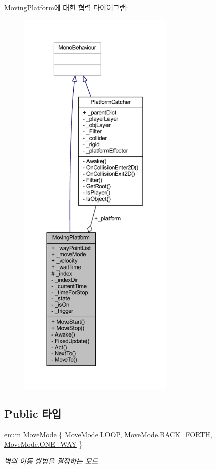 Moving\+Platform에 대한 협력 다이어그램\+:
\nopagebreak
\begin{figure}[H]
\begin{center}
\leavevmode
\includegraphics[height=550pt]{df/d56/class_moving_platform__coll__graph}
\end{center}
\end{figure}
\subsection*{Public 타입}
\begin{DoxyCompactItemize}
\item 
enum \mbox{\hyperlink{class_moving_platform_a7b3427d2906069ecf4c39d69eee53653}{Move\+Mode}} \{ \mbox{\hyperlink{class_moving_platform_a7b3427d2906069ecf4c39d69eee53653a9159b3578e4e1eb31ffdf90acd6f6e40}{Move\+Mode.\+L\+O\+OP}}, 
\mbox{\hyperlink{class_moving_platform_a7b3427d2906069ecf4c39d69eee53653a567fc8818cb224cde6a676cb700ac1e3}{Move\+Mode.\+B\+A\+C\+K\+\_\+\+F\+O\+R\+TH}}, 
\mbox{\hyperlink{class_moving_platform_a7b3427d2906069ecf4c39d69eee53653aaa30404ca3fb4604d829dacae0444dd1}{Move\+Mode.\+O\+N\+E\+\_\+\+W\+AY}}
 \}
\begin{DoxyCompactList}\small\item\em 벽의 이동 방법을 결정하는 모드 \end{DoxyCompactList}\end{DoxyCompactItemize}
